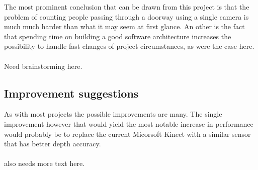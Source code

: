 The most prominent conclusion that can be drawn from this project is that the problem of counting people passing through a doorway using a single camera is much much harder than what it may seem at first glance. An other is the fact that spending time on building a good software architecture increases the possibility to handle fast changes of project circumstances, as were the case here.\\
\\
Need brainstorming here.

\subsection{Improvement suggestions}
As with most projects the possible improvements are many. The single improvement however that would yield the most notable increase in performance would probably be to replace the current Micorsoft Kinect with a similar sensor that has better depth accuracy.\\
\\
also needs more text here.















